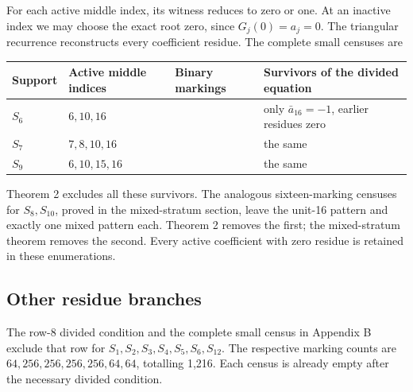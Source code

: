 \documentclass[
  british,
  10pt,
  a4paper,
]{article}
\newcounter{none} %
\begin{document}
For each active middle index, its witness reduces to zero or one. At an
inactive index we may choose the exact root zero, since
\(G_j(0)=a_j=0\). The triangular recurrence reconstructs every
coefficient residue. The complete small censuses are

{\def\LTcaptype{none} %
\begin{longtable}[]{@{}
  >{\raggedright\arraybackslash}p{}
  >{\raggedright\arraybackslash}p{}
  >{\raggedleft\arraybackslash}p{}
  >{\raggedright\arraybackslash}p{}@{}}
\toprule\noalign{}
\begin{minipage}[b]{\linewidth}\raggedright
Support
\end{minipage} & \begin{minipage}[b]{\linewidth}\raggedright
Active middle indices
\end{minipage} & \begin{minipage}[b]{\linewidth}\raggedleft
Binary markings
\end{minipage} & \begin{minipage}[b]{\linewidth}\raggedright
Survivors of the divided equation
\end{minipage} \\
\midrule\noalign{}
\endhead
\bottomrule\noalign{}
\endlastfoot
\(S_6\) & \(6,10,16\) & 8 & only \(\bar a_{16}=-1\), earlier residues
zero \\
\(S_7\) & \(7,8,10,16\) & 16 & the same \\
\(S_9\) & \(6,10,15,16\) & 16 & the same \\
\end{longtable}
}

Theorem 2 excludes all these survivors. The analogous sixteen-marking
censuses for \(S_8,S_{10}\), proved in the mixed-stratum section, leave
the unit-16 pattern and exactly one mixed pattern each. Theorem 2
removes the first; the mixed-stratum theorem removes the second. Every
active coefficient with zero residue is retained in these enumerations.

\subsection{Other residue branches}\label{other-residue-branches}

The row-8 divided condition and the complete small census in Appendix B
exclude that row for \(S_1,S_2,S_3,S_4,S_5,S_6,S_{12}\). The respective
marking counts are \(64,256,256,256,256,64,64\), totalling 1,216. Each
census is already empty after the necessary divided condition.
\end{document}
